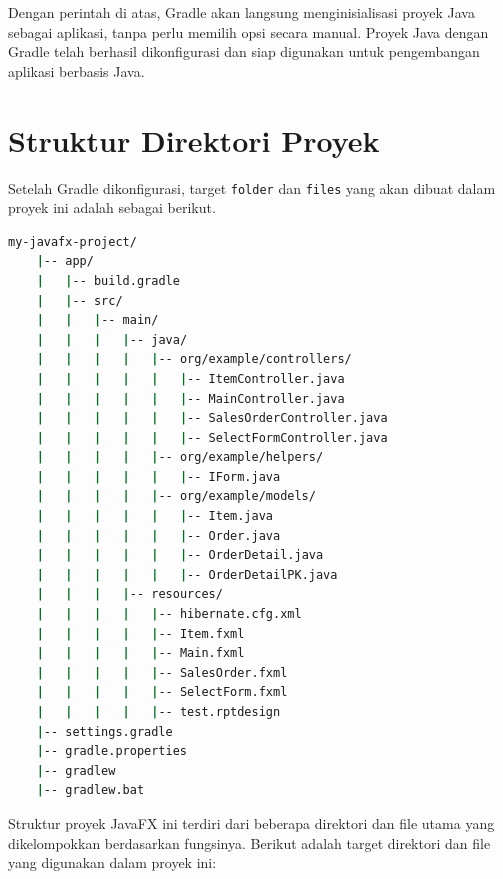Dengan perintah di atas, Gradle akan langsung menginisialisasi proyek Java sebagai aplikasi, tanpa perlu memilih opsi secara manual. Proyek Java dengan Gradle telah berhasil dikonfigurasi dan siap digunakan untuk pengembangan aplikasi berbasis Java.

\section{Struktur Direktori Proyek}
Setelah Gradle dikonfigurasi, target \texttt{folder} dan \texttt{files} yang akan dibuat dalam proyek ini adalah sebagai berikut.

\begin{lstlisting}[language=bash]
	my-javafx-project/
	|-- app/
	|   |-- build.gradle
	|   |-- src/
	|   |   |-- main/
	|   |   |   |-- java/
	|   |   |   |   |-- org/example/controllers/
	|   |   |   |   |   |-- ItemController.java
	|   |   |   |   |   |-- MainController.java
	|   |   |   |   |   |-- SalesOrderController.java
	|   |   |   |   |   |-- SelectFormController.java
	|   |   |   |   |-- org/example/helpers/
	|   |   |   |   |   |-- IForm.java
	|   |   |   |   |-- org/example/models/
	|   |   |   |   |   |-- Item.java
	|   |   |   |   |   |-- Order.java
	|   |   |   |   |   |-- OrderDetail.java
	|   |   |   |   |   |-- OrderDetailPK.java
	|   |   |   |-- resources/
	|   |   |   |   |-- hibernate.cfg.xml
	|   |   |   |   |-- Item.fxml
	|   |   |   |   |-- Main.fxml
	|   |   |   |   |-- SalesOrder.fxml
	|   |   |   |   |-- SelectForm.fxml
	|   |   |   |   |-- test.rptdesign
	|-- settings.gradle
	|-- gradle.properties
	|-- gradlew
	|-- gradlew.bat
\end{lstlisting}


Struktur proyek JavaFX ini terdiri dari beberapa direktori dan file utama yang dikelompokkan berdasarkan fungsinya. Berikut adalah target direktori dan file yang digunakan dalam proyek ini:


